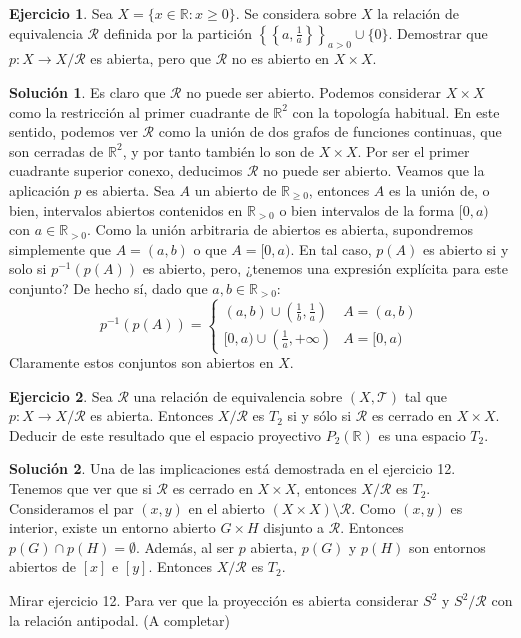 \documentclass{article}
\theoremstyle{plain}
\theoremstyle{definition}
\newtheorem{exercise}{Ejercicio}
\newtheorem*{sol*}{Solución}
\newcommand{\R}{\mathbb{R}}
\begin{document}
\newpage
\begin{exercise}
Sea $X = \{x \in \mathbb{R} : x \geq 0\}$. Se considera sobre $X$ la relación de equivalencia $\mathcal{R}$ definida por la partición $\left\{\left\{a, \frac{1}{a}\right\} \right\}_{a > 0} \cup \{0\}$. Demostrar que $p : X \to X/\mathcal{R}$ es abierta, pero que $\mathcal{R}$ no es abierto en $X \times X$.
\end{exercise}
\begin{sol*}
Es claro que $\mathcal{R}$ no puede ser abierto. Podemos considerar $X\times X$ como la restricción al primer cuadrante de $\R^2$ con la topología habitual. En este sentido, podemos ver $\mathcal{R}$ como la unión de dos grafos de funciones continuas, que son cerradas de $\R^2$, y por tanto también lo son de $X\times X$. Por ser el primer cuadrante superior conexo, deducimos $\mathcal{R}$ no puede ser abierto. 
\newline
Veamos que la aplicación $p$ es abierta. Sea $A$ un abierto de $\R_{\geq 0}$, entonces $A$ es la unión de, o bien, intervalos abiertos contenidos en $\R_{>0}$ o bien intervalos de la forma $[0,a)$ con $a\in\R_{>0}$. Como la unión arbitraria de abiertos es abierta, supondremos simplemente que $A=(a,b)$ o que $A=[0,a)$. En tal caso, $p(A)$ es abierto si y solo si $p^{-1}(p(A))$ es abierto, pero, ¿tenemos una expresión explícita para este conjunto? De hecho sí, dado que $a,b\in \R_{>0}$:
\[
p^{-1}(p(A))=
\begin{cases}
(a,b)\cup\left(\frac{1}{b},\frac{1}{a}\right) & A = (a,b)\\
[0,a)\cup \left(\frac{1}{a},+\infty\right) & A = [0,a)
\end{cases}
\]
Claramente estos conjuntos son abiertos en $X$.
\end{sol*}

\newpage
\begin{exercise}
Sea $\mathcal{R}$ una relación de equivalencia sobre $(X, \mathcal{T})$ tal que $p : X \to X/\mathcal{R}$ es abierta. Entonces $X/\mathcal{R}$ es $T_2$ si y sólo si $\mathcal{R}$ es cerrado en $X \times X$. Deducir de este resultado que el espacio proyectivo $P_2(\mathbb{R})$ es una espacio $T_2$.
\end{exercise}
\begin{sol*}
Una de las implicaciones está demostrada en el ejercicio 12. Tenemos que ver que si $\mathcal{R}$ es cerrado en $X \times X$, entonces $X / \mathcal{R}$ es $T_2$. Consideramos el par $(x,y)$ en el abierto $(X \times X) \setminus \mathcal{R}$. Como $(x,y)$ es interior, existe un entorno abierto $G \times H$ disjunto a $\mathcal{R}$. Entonces $p(G) \cap p(H) = \emptyset$. Además, al ser $p$ abierta, $p(G)$ y $p(H)$ son entornos abiertos de $[x]$ e $[y]$. Entonces $X/\mathcal{R}$ es $T_2$.  

Mirar ejercicio 12. Para ver que la proyección es abierta considerar $S^2$ y $S^2/\mathcal{R}$ con la relación antipodal. (A completar)
\end{sol*}
\end{document}
